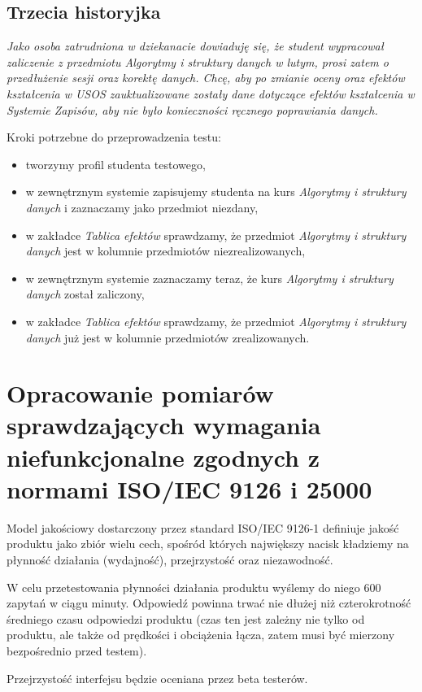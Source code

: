 \documentclass{article}
\begin{document}
\subsection{Trzecia historyjka}
\textit{Jako osoba zatrudniona w dziekanacie dowiaduję się, że student wypracował zaliczenie z przedmiotu \textit{Algorytmy i struktury danych} w lutym, prosi zatem o przedłużenie sesji oraz korektę danych. 
Chcę, aby po zmianie oceny oraz efektów kształcenia w USOS zauktualizowane zostały dane dotyczące efektów kształcenia w Systemie Zapisów, aby nie było konieczności ręcznego poprawiania danych.}

\medskip
\noindent Kroki potrzebne do przeprowadzenia testu:
\begin{itemize}
 \item tworzymy profil studenta testowego,
 \item w zewnętrznym systemie zapisujemy studenta na kurs \textit{Algorytmy i struktury danych} i zaznaczamy jako przedmiot niezdany,
 \item w zakładce \textit{Tablica efektów} sprawdzamy, że przedmiot \textit{Algorytmy i struktury danych} jest w kolumnie przedmiotów niezrealizowanych,
 \item w zewnętrznym systemie zaznaczamy teraz, że kurs \textit{Algorytmy i struktury danych} został zaliczony,
 \item w zakładce \textit{Tablica efektów} sprawdzamy, że przedmiot \textit{Algorytmy i struktury danych} już jest w kolumnie przedmiotów zrealizowanych.
\end{itemize}

\section{Opracowanie pomiarów sprawdzających wymagania niefunkcjonalne zgodnych z normami ISO/IEC 9126 i 25000}
Model jakościowy dostarczony przez standard ISO/IEC 9126-1 definiuje jakość produktu jako zbiór wielu cech, spośród których największy nacisk kładziemy na płynność działania (wydajność), przejrzystość oraz niezawodność.

W celu przetestowania płynności działania produktu wyślemy do niego 600 zapytań w ciągu minuty.
Odpowiedź powinna trwać nie dłużej niż czterokrotność średniego czasu odpowiedzi produktu (czas ten jest zależny nie tylko od produktu, ale także od prędkości i obciążenia łącza, zatem musi być mierzony bezpośrednio przed testem).

Przejrzystość interfejsu będzie oceniana przez beta testerów.
\end{document}
